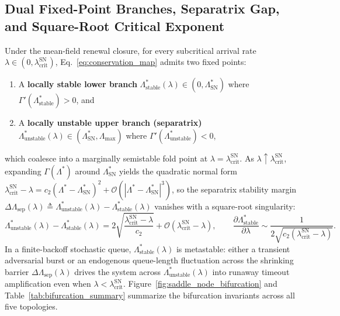 \documentclass[12pt,onecolumn]{article}
\begin{document}
\subsection{Dual Fixed-Point Branches, Separatrix Gap, and Square-Root Critical Exponent}
Under the mean-field renewal closure, for every subcritical arrival rate $\lambda \in (0, \lambda_{\text{crit}}^{\text{SN}})$, Eq.~\eqref{eq:conservation_map} admits two fixed points:
\begin{enumerate}
    \item A \textbf{locally stable lower branch} $\Lambda_{\text{stable}}^*(\lambda) \in (0, \Lambda_{\text{SN}}^*)$ where $\Gamma'(\Lambda_{\text{stable}}^*) > 0$, and
    \item A \textbf{locally unstable upper branch (separatrix)} $\Lambda_{\text{unstable}}^*(\lambda) \in (\Lambda_{\text{SN}}^*, \Lambda_{\max})$ where $\Gamma'(\Lambda_{\text{unstable}}^*) < 0$,
\end{enumerate}
which coalesce into a marginally semistable fold point at $\lambda = \lambda_{\text{crit}}^{\text{SN}}$. As $\lambda \uparrow \lambda_{\text{crit}}^{\text{SN}}$, expanding $\Gamma(\Lambda^*)$ around $\Lambda_{\text{SN}}^*$ yields the quadratic normal form $\lambda_{\text{crit}}^{\text{SN}} - \lambda = c_2(\Lambda^* - \Lambda_{\text{SN}}^*)^2 + \mathcal{O}(|\Lambda^* - \Lambda_{\text{SN}}^*|^3)$, so the separatrix stability margin $\Delta\Lambda_{\text{sep}}(\lambda) \triangleq \Lambda_{\text{unstable}}^*(\lambda) - \Lambda_{\text{stable}}^*(\lambda)$ vanishes with a square-root singularity:
\begin{equation}
\Lambda_{\text{unstable}}^*(\lambda) - \Lambda_{\text{stable}}^*(\lambda) = 2\sqrt{\frac{\lambda_{\text{crit}}^{\text{SN}} - \lambda}{c_2}} + \mathcal{O}(\lambda_{\text{crit}}^{\text{SN}} - \lambda), \qquad
\frac{\partial \Lambda_{\text{stable}}^*}{\partial \lambda} \sim \frac{1}{2\sqrt{c_2(\lambda_{\text{crit}}^{\text{SN}} - \lambda)}}.
\label{eq:sqrt_scaling}
\end{equation}
In a finite-backoff stochastic queue, $\Lambda_{\text{stable}}^*(\lambda)$ is metastable: either a transient adversarial burst or an endogenous queue-length fluctuation across the shrinking barrier $\Delta\Lambda_{\text{sep}}(\lambda)$ drives the system across $\Lambda_{\text{unstable}}^*(\lambda)$ into runaway timeout amplification even when $\lambda < \lambda_{\text{crit}}^{\text{SN}}$. Figure~\ref{fig:saddle_node_bifurcation} and Table~\ref{tab:bifurcation_summary} summarize the bifurcation invariants across all five topologies.
\end{document}
